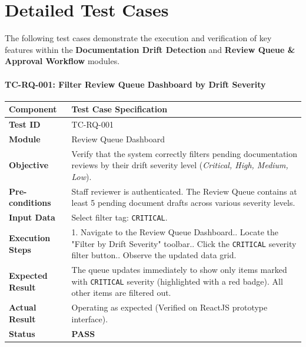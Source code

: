 \section{Detailed Test Cases}

The following test cases demonstrate the execution and verification of key features within the \textbf{Documentation Drift Detection} and \textbf{Review Queue \& Approval Workflow} modules.

\paragraph{TC-RQ-001: Filter Review Queue Dashboard by Drift Severity}

\begin{longtable}{|l|p{10.5cm}|}
    \hline
    \textbf{Component} & \textbf{Test Case Specification} \\ \hline
    \textbf{Test ID} & TC-RQ-001 \\ \hline
    \textbf{Module} & Review Queue Dashboard \\ \hline
    \textbf{Objective} & Verify that the system correctly filters pending documentation reviews by their drift severity level (\textit{Critical, High, Medium, Low}). \\ \hline
    \textbf{Pre-conditions} & Staff reviewer is authenticated. The Review Queue contains at least 5 pending document drafts across various severity levels. \\ \hline
    \textbf{Input Data} & Select filter tag: \texttt{CRITICAL}. \\ \hline
    \textbf{Execution Steps} & 
    1. Navigate to the Review Queue Dashboard.\newline
    2. Locate the "Filter by Drift Severity" toolbar.\newline
    3. Click the \texttt{CRITICAL} severity filter button.\newline
    4. Observe the updated data grid. \\ \hline
    \textbf{Expected Result} & The queue updates immediately to show only items marked with \texttt{CRITICAL} severity (highlighted with a red badge). All other items are filtered out. \\ \hline
    \textbf{Actual Result} & Operating as expected (Verified on ReactJS prototype interface). \\ \hline
    \textbf{Status} & \textbf{\color{green}PASS} \\ \hline
\end{longtable}

